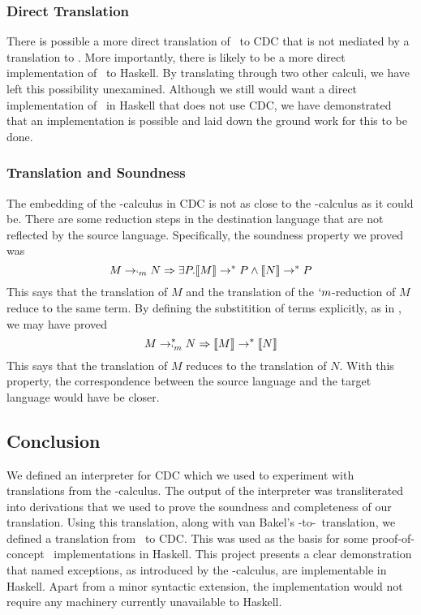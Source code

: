 \subsubsection{Direct Translation}
There is possible a more direct translation of \ltry\ to CDC that is not mediated by a translation to \lmu.
More importantly, there is likely to be a more direct implementation of \ltry\ to Haskell.
By translating through two other calculi, we have left this possibility unexamined.
Although we still would want a direct implementation of \ltry\ in Haskell that does not use CDC,
we have demonstrated that an implementation is possible and laid down the ground work for this to be done.

%

\subsubsection{Translation and Soundness}
The embedding of the \lmu-calculus in CDC is not as close to the \lmu-calculus as it could be.
There are some reduction steps in the destination language that are not reflected by the source language.
Specifically, the soundness property we proved was
\[
  M \to_{`m} N \Rightarrow \exists P. \llbracket M \rrbracket \to^{*} P \land \llbracket N \rrbracket \to^{*} P
\]
This says that the translation of $M$ and the translation of the $`m$-reduction of $M$ reduce to the same term.
By defining the substitition of terms explicitly, as in \cite{Bakel14}, we may have proved
\[
  M \to_{`m}^{*} N \Rightarrow \llbracket M \rrbracket \to^{*} \llbracket N \rrbracket
\]
This says that the translation of $M$ reduces to the translation of $N$.
With this property, the correspondence between the source language and the target language would have be closer.

\subsection{Conclusion}
We defined an interpreter for CDC which we used to experiment with translations from the \lmu-calculus.
The output of the interpreter was transliterated into derivations that we used to prove the soundness and completeness of our translation.
Using this translation, along with van Bakel's \ltry-to-\lmu\ translation, we defined a translation from \ltry\ to CDC.
This was used as the basis for some proof-of-concept \ltry\ implementations in Haskell.
This project presents a clear demonstration that named exceptions, as introduced by the \ltry-calculus, are implementable in Haskell.
Apart from a minor syntactic extension,
the implementation would not require any machinery currently unavailable to Haskell.
    
